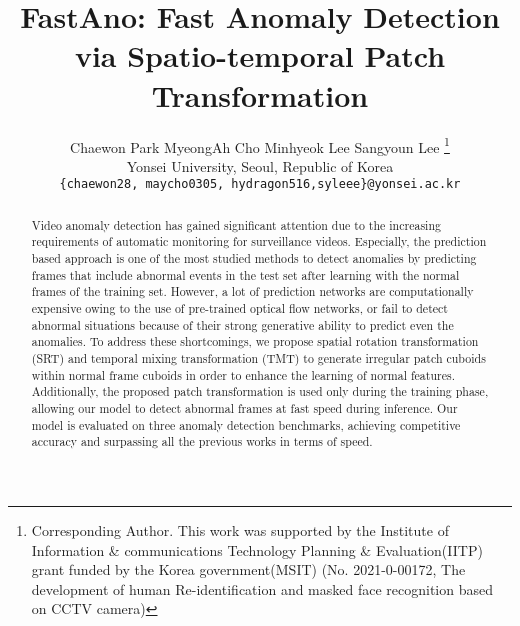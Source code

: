 \documentclass[10pt,twocolumn,letterpaper]{article}
\begin{document}
\title{FastAno: Fast Anomaly Detection\\via Spatio-temporal Patch Transformation}

\author{
	Chaewon Park \quad
	MyeongAh Cho \quad
	Minhyeok Lee \quad
	Sangyoun Lee
	\thanks{Corresponding Author. \newline \hspace*{0.16in} This work was supported by the Institute of Information \& communications Technology Planning \& Evaluation(IITP) grant funded by the Korea government(MSIT) (No. 2021-0-00172, The development of human Re-identification and masked face recognition based on CCTV camera)}
\vspace{0.01cm}\\
	Yonsei University, Seoul, Republic of Korea \\
	{\tt\small \{chaewon28, maycho0305, hydragon516,syleee\}@yonsei.ac.kr}
}
\setlength{\textfloatsep}{7pt}
\maketitle

\ifwacvfinal
\thispagestyle{empty}
\fi

\begin{abstract}
	Video anomaly detection has gained significant attention due to the increasing requirements of automatic monitoring for surveillance videos. Especially, the prediction based approach is one of the most studied methods to detect anomalies by predicting frames that include abnormal events in the test set after learning with the normal frames of the training set. 
	However, a lot of prediction networks are computationally expensive owing to the use of pre-trained optical flow networks, or fail to detect abnormal situations because of their strong generative ability to predict even the anomalies. 
	To address these shortcomings, we propose spatial rotation transformation (SRT) and temporal mixing transformation (TMT) to generate irregular patch cuboids within normal frame cuboids in order to enhance the learning of normal features.  Additionally, the proposed patch transformation is used only during the training phase, allowing our model to detect abnormal frames at fast speed during inference.   
	Our model is evaluated on three anomaly detection benchmarks, achieving competitive accuracy and surpassing all the previous works in terms of speed.  
	
	
\end{abstract}

\thispagestyle{empty}
\end{document}
